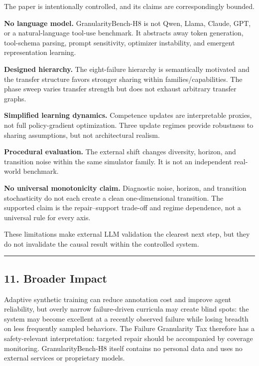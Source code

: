 \documentclass[
]{article}
\begin{document}
The paper is intentionally controlled, and its claims are
correspondingly bounded.

\textbf{No language model.} GranularityBench-H8 is not Qwen, Llama,
Claude, GPT, or a natural-language tool-use benchmark. It abstracts away
token generation, tool-schema parsing, prompt sensitivity, optimizer
instability, and emergent representation learning.

\textbf{Designed hierarchy.} The eight-failure hierarchy is semantically
motivated and the transfer structure favors stronger sharing within
families/capabilities. The phase sweep varies transfer strength but does
not exhaust arbitrary transfer graphs.

\textbf{Simplified learning dynamics.} Competence updates are
interpretable proxies, not full policy-gradient optimization. Three
update regimes provide robustness to sharing assumptions, but not
architectural realism.

\textbf{Procedural evaluation.} The external shift changes diversity,
horizon, and transition noise within the same simulator family. It is
not an independent real-world benchmark.

\textbf{No universal monotonicity claim.} Diagnostic noise, horizon, and
transition stochasticity do not each create a clean one-dimensional
transition. The supported claim is the repair--support trade-off and
regime dependence, not a universal rule for every axis.

These limitations make external LLM validation the clearest next step,
but they do not invalidate the causal result within the controlled
system.

\begin{center}\rule{0.5\linewidth}{0.5pt}\end{center}

\subsection{11. Broader Impact}\label{broader-impact}

Adaptive synthetic training can reduce annotation cost and improve agent
reliability, but overly narrow failure-driven curricula may create blind
spots: the system may become excellent at a recently observed failure
while losing breadth on less frequently sampled behaviors. The Failure
Granularity Tax therefore has a safety-relevant interpretation: targeted
repair should be accompanied by coverage monitoring. GranularityBench-H8
itself contains no personal data and uses no external services or
proprietary models.
\end{document}
